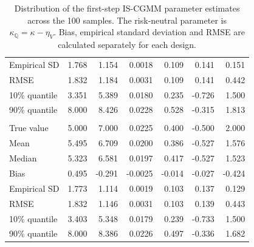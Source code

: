 \begin{table}[H]
\begin{tabular}{lrrrrrr}
Empirical SD & 1.768 & 1.154 & 0.0018 & 0.109 & 0.141 & 0.151 \\
RMSE & 1.832 & 1.184 & 0.0031 & 0.109 & 0.141 & 0.442 \\
10\% quantile & 3.351 & 5.389 & 0.0180 & 0.235 & -0.726 & 1.500 \\
90\% quantile & 8.000 & 8.426 & 0.0228 & 0.528 & -0.315 & 1.813 \\
\addlinespace
\multicolumn{7}{l}{\textit{Panel D: Design C: persistent factor ($n=100$)}} \\
True value & 5.000 & 7.000 & 0.0225 & 0.400 & -0.500 & 2.000 \\
Mean & 5.495 & 6.709 & 0.0200 & 0.386 & -0.527 & 1.576 \\
Median & 5.323 & 6.581 & 0.0197 & 0.417 & -0.527 & 1.523 \\
Bias & 0.495 & -0.291 & -0.0025 & -0.014 & -0.027 & -0.424 \\
Empirical SD & 1.773 & 1.114 & 0.0019 & 0.103 & 0.137 & 0.129 \\
RMSE & 1.832 & 1.146 & 0.0031 & 0.103 & 0.139 & 0.443 \\
10\% quantile & 3.403 & 5.348 & 0.0179 & 0.239 & -0.733 & 1.500 \\
90\% quantile & 8.000 & 8.386 & 0.0226 & 0.497 & -0.336 & 1.682 \\
\bottomrule
\end{tabular}
\caption{Distribution of the first-step IS-CGMM parameter estimates across the 100 samples. The risk-neutral parameter is $\kappa_{\mathbb Q}=\kappa-\eta_V$. Bias, empirical standard deviation and RMSE are calculated separately for each design.}
\label{tab:mc_structural_parameters}
\end{table}
